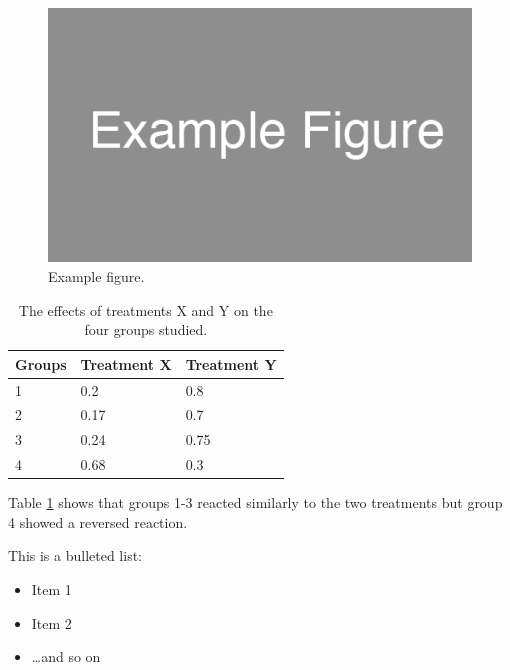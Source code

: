 \documentclass[idxtotoc,hyperref,openany]{labbook} %
\begin{document}




\begin{figure}[H] %
\begin{center}
\includegraphics[width=0.5\linewidth]{example_figure}
\end{center}
\caption{Example figure.}
\label{fig:example_figure}
\end{figure}


\begin{table}[H]
\begin{tabular}{l l l}
\toprule
\textbf{Groups} & \textbf{Treatment X} & \textbf{Treatment Y} \\
\toprule
1 & 0.2 & 0.8\\
2 & 0.17 & 0.7\\
3 & 0.24 & 0.75\\
4 & 0.68 & 0.3\\
\bottomrule
\end{tabular}
\caption{The effects of treatments X and Y on the four groups studied.}
\label{tab:treatments_xy}
\end{table}
Table \ref{tab:treatments_xy} shows that groups 1-3 reacted similarly to the two treatments but group 4 showed a reversed reaction.

This is a bulleted list:

\begin{itemize}
\item Item 1
\item Item 2
\item \ldots and so on
\end{itemize}


\end{document}
